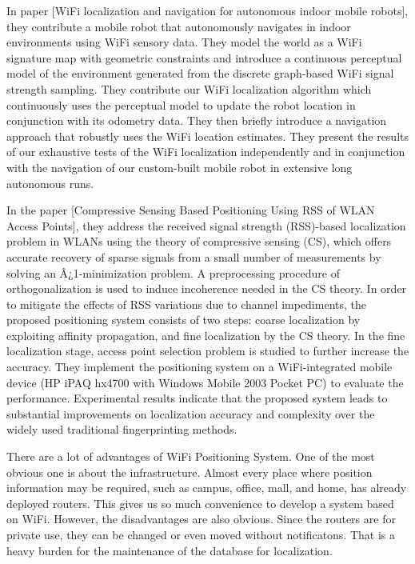 \documentclass[12pt]{report}
\begin{document}
In paper [WiFi localization and navigation for autonomous indoor mobile robots], they contribute a mobile robot that autonomously navigates in indoor environments using WiFi sensory data. They model the world as a WiFi signature map with geometric constraints and introduce a continuous perceptual model of the environment generated from the discrete graph-based WiFi signal strength sampling. They contribute our WiFi localization algorithm which continuously uses the perceptual model to update the robot location in conjunction with its odometry data. They then briefly introduce a navigation approach that robustly uses the WiFi location estimates. They present the results of our exhaustive tests of the WiFi localization independently and in conjunction with the navigation of our custom-built mobile robot in extensive long autonomous runs. 

In the paper [Compressive Sensing Based Positioning Using RSS of WLAN Access Points], they address the received signal strength (RSS)-based localization problem in WLANs using the theory of compressive sensing (CS), which offers accurate recovery of sparse signals from a small number of measurements by solving an Â¿1-minimization problem. A preprocessing procedure of orthogonalization is used to induce incoherence needed in the CS theory. In order to mitigate the effects of RSS variations due to channel impediments, the proposed positioning system consists of two steps: coarse localization by exploiting affinity propagation, and fine localization by the CS theory. In the fine localization stage, access point selection problem is studied to further increase the accuracy. They implement the positioning system on a WiFi-integrated mobile device (HP iPAQ hx4700 with Windows Mobile 2003 Pocket PC) to evaluate the performance. Experimental results indicate that the proposed system leads to substantial improvements on localization accuracy and complexity over the widely used traditional fingerprinting methods.

There are a lot of advantages of WiFi Positioning System. One of the most obvious one is about the infrastructure. Almost every place where position information may be required, such as campus, office, mall, and home, has already deployed routers. This gives us so much convenience to develop a system based on WiFi. However, the disadvantages are also obvious. Since the routers are for private use, they can be changed or even moved without notificatons. That is a heavy burden for the maintenance of the database for localization.
\end{document}
